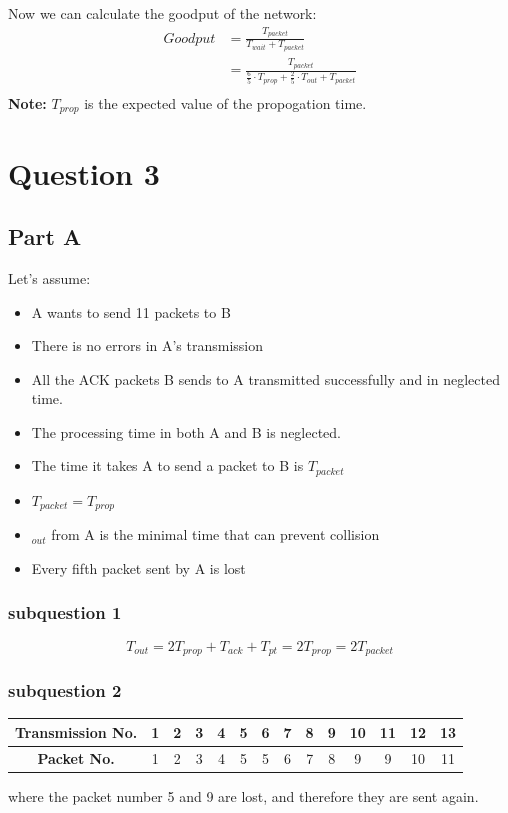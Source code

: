 \documentclass{article}
\begin{document}
    Now we can calculate the goodput of the network:
    \begin{equation}
        \begin{split}
            Goodput &= \frac{T_{packet}}{T_{wait}+T_{packet}} \\
            &= \frac{T_{packet}}{\frac{6}{5} \cdot  T_{prop} + \frac{2}{5} \cdot T _{out} + T_{packet}} \\
        \end{split}
    \end{equation} 
    \textbf{Note:} $T_{prop}$ is the expected value of the propogation time.

    \section{Question 3}
    \subsection{Part A}
    Let's assume:
    \begin{itemize}
        \item A wants to send 11 packets to B
        \item There is no errors in A's transmission
        \item All the ACK packets B sends to A transmitted successfully and in neglected time.
        \item The processing time in both A and B is neglected.
        \item The time it takes A to send a packet to B is $T_{packet}$
        \item $T_{packet} =T_{prop}$
        \item $_{out}$ from A is the minimal time that can prevent collision
        \item Every fifth packet sent by A is lost
    \end{itemize}
    \subsubsection{subquestion 1}
    \begin{equation}
        T_{out}  = 2T_{prop} + T_{ack} + T_{pt} = 2T_{prop} = 2T_{packet}
    \end{equation}

    \subsubsection{subquestion 2}
    \begin{table}[ht]
        \centering
        \begin{tabular}{|c|c|c|c|c|c|c|c|c|c|c|c|c|c|}
            \hline
            \textbf{Transmission No.} & 1 & 2 & 3 & 4 & 5 & 6 & 7 & 8 & 9 & 10 & 11 & 12 & 13 \\
            \hline
            \textbf{Packet No.} & 1 & 2 & 3 & 4 & 5 & 5 &6 & 7 & 8 & 9 & 9 & 10 & 11  \\
            \hline
        \end{tabular}
    \end{table}
    where the packet number 5 and 9 are lost, and therefore they are sent again.
    
\end{document}
